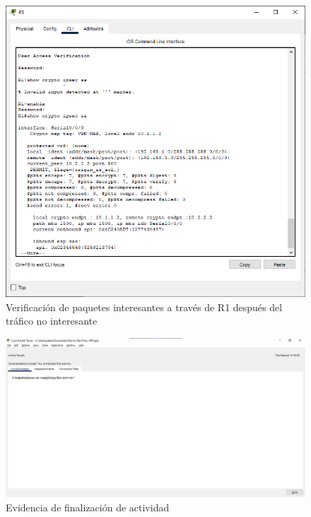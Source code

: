 \documentclass{article}
\begin{document}
        \begin{figure}[!h]
            \centering
            \includegraphics[scale=0.45]{img/task3-step5.png}
            \caption{Verificación de paquetes interesantes a través de R1 después del tráfico no interesante}
            \label{fig:task3-step5}
        \end{figure}

        \clearpage
        \begin{landscape}
            \begin{figure}[!h]
                \centering
                \includegraphics[scale=0.6]{img/task-completed.png}
                \caption{Evidencia de finalización de actividad}
                \label{fig:task-completed}
            \end{figure}
        \end{landscape}
\end{document}
